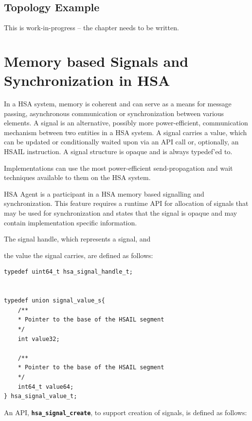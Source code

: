 \documentclass{book}
\newcommand{\diffblock}[1]{#1}
\newcommand{\ttbf}[1]{\diffblock{\texttt{\textbf{#1}}}}
\begin{document}
\hypertarget{topology_example}{} \subsection{Topology Example}
This is {\color{red} work-in-progress} -- the chapter needs to be written.

\hypertarget{signals}{}\section{Memory based Signals and
Synchronization in H\-S\-A}\label{signals}

In a HSA system, memory is coherent and can serve as a means for
message passing, asynchronous communication or synchronization
between various elements.  A signal is an alternative, possibly more
power-efficient, communication mechanism between two entities in a
H\-S\-A system. A signal carries a value, which can be updated or
conditionally waited upon via an API call or, optionally, an HSAIL
instruction.
A signal structure is opaque and is always typedef'ed to.

Implementations can use the most power-efficient send-propagation
and wait techniques available to them on the HSA system.

HSA Agent is a
participant in a HSA memory based signalling and synchronization.
This feature requires a
runtime API for allocation of signals that may be used for
synchronization and states that the signal is opaque and may contain
implementation specific information.

The signal handle, which represents a signal, and

the value the signal carries, are defined as follows:

\begin{lstlisting}
typedef uint64_t hsa_signal_handle_t;


typedef union signal_value_s{
    /**
    * Pointer to the base of the HSAIL segment
    */
    int value32;

    /**
    * Pointer to the base of the HSAIL segment
    */
    int64_t value64;
} hsa_signal_value_t;
\end{lstlisting}

An API, \ttbf{hsa\_signal\_create}, to support
creation of signals, is defined as follows:
\end{document}
